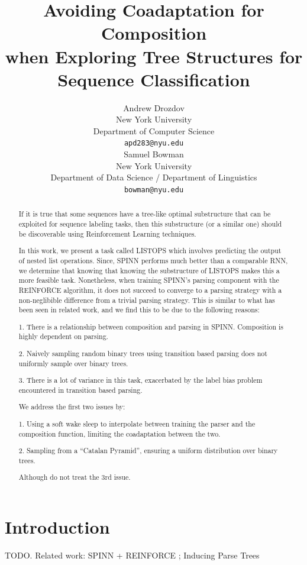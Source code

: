 \documentclass[11pt,a4paper]{article}
\title{Avoiding Coadaptation for Composition \\ when Exploring Tree Structures for Sequence Classification\Thanks{Thanks for the fish (obligatory {\em Hitchhiker's Guide} Reference)!}}
\author{Andrew Drozdov \\
  New York University \\
  Department of Computer Science \\
  {\tt apd283@nyu.edu} \\\And
  Samuel Bowman \\
  New York University \\
  Department of Data Science / Department of Linguistics \\
  {\tt bowman@nyu.edu} \\}
\date{}
\begin{document}
\maketitle
\begin{abstract}
  If it is true that some sequences have a tree-like optimal substructure that can
  be exploited for sequence labeling tasks, then this substructure (or a similar one) should be
  discoverable using Reinforcement Learning techniques.

  In this work, we present a task called LISTOPS which involves predicting the output
  of nested list operations. Since, SPINN performs much better than a comparable
  RNN, we determine that knowing that knowing the substructure of LISTOPS
  makes this a more feasible task. Nonetheless, when training
  SPINN's parsing component with the REINFORCE algorithm, it does not succeed
  to converge to a parsing strategy with a non-neglibible difference from a trivial
  parsing strategy. This is similar to what has been seen in related work, and we find this
  to be due to the following reasons:

1. There is a relationship between composition and parsing in SPINN. Composition is highly dependent on parsing.

2. Naively sampling random binary trees using transition based parsing does not uniformly sample over binary trees.

3. There is a lot of variance in this task, exacerbated by the label bias problem encountered in transition based parsing.

We address the first two issues by:

1. Using a soft wake sleep to interpolate between training the parser and the composition function, limiting the coadaptation between the two.

2. Sampling from a ``Catalan Pyramid'', ensuring a uniform distribution over binary trees.

Although do not treat the 3rd issue.

\end{abstract}

\section{Introduction}

TODO. Related work: SPINN + REINFORCE \cite{yogatama2016learning}; Inducing Parse Trees \cite{dyer2016rnng}

\end{document}
